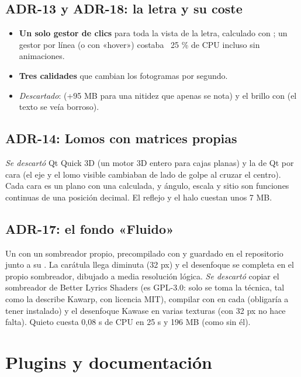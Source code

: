 \subsection{ADR-13 y ADR-18: la letra y su coste}

\begin{itemize}
  \item \textbf{Un solo gestor de clics} para toda la vista de la letra, calculado con
  ; un gestor por línea (o con «hover») costaba ~25 \% de CPU incluso sin
  animaciones.
  \item \textbf{Tres calidades} que cambian los fotogramas por segundo.
  \item \emph{Descartado}:  (+95 MB para una nitidez que apenas se
  nota) y el brillo con  (el texto se veía borroso).
\end{itemize}

\subsection{ADR-14: Lomos con matrices propias}

\emph{Se descartó} Qt Quick 3D (un motor 3D entero para cajas planas) y la  de
Qt por cara (el eje y el lomo visible cambiaban de lado de golpe al cruzar el centro). Cada
cara es un  plano con una  calculada, y ángulo, escala y sitio son
funciones continuas de una posición decimal. El reflejo y el halo cuestan unos 7 MB.

\subsection{ADR-17: el fondo «Fluido»}

Un  con un sombreador propio, precompilado con  y guardado en el
repositorio junto a su . La carátula llega diminuta (32 px) y el desenfoque se
completa en el propio sombreador, dibujado a media resolución lógica. \emph{Se descartó}
copiar el sombreador de Better Lyrics Shaders (es GPL-3.0: solo se toma la técnica, tal como
la describe Kawarp, con licencia MIT), compilar con  en cada  (obligaría a tener 
instalado) y el desenfoque Kawase en varias texturas (con 32 px no hace falta). Quieto cuesta
0,08 s de CPU en 25 s y 196 MB (como sin él).

\section{Plugins y documentación}

